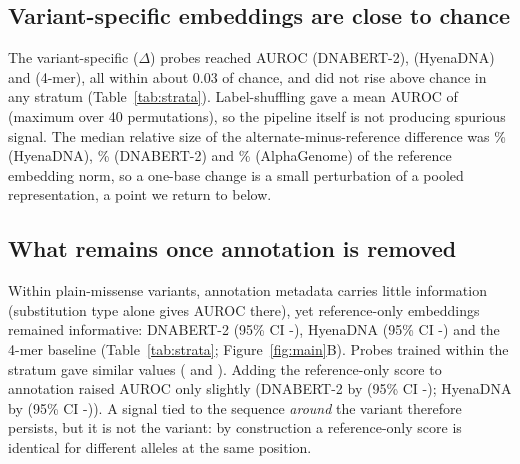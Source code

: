 \documentclass[11pt]{article}
\newcommand{\Dlt}{\Delta}
\newcommand{\ci}[2]{{\small(95\% CI #1-#2)}}
\begin{document}
\subsection{Variant-specific embeddings are close to chance}
The variant-specific ($\Dlt$) probes reached AUROC \DnbDelta{} (DNABERT-2), \HynDelta{} (HyenaDNA) and \KmDelta{} (4-mer), all within about 0.03 of chance, and did not rise above chance in any stratum (Table~\ref{tab:strata}). Label-shuffling gave a mean AUROC of \ShufMean{} (maximum \ShufMax{} over 40 permutations), so the pipeline itself is not producing spurious signal. The median relative size of the alternate-minus-reference difference was \RelHyn\% (HyenaDNA), \RelDnb\% (DNABERT-2) and \RelAg\% (AlphaGenome) of the reference embedding norm, so a one-base change is a small perturbation of a pooled representation, a point we return to below.

\subsection{What remains once annotation is removed}
Within plain-missense variants, annotation metadata carries little information (substitution type alone gives AUROC \MetaPure{} there), yet reference-only embeddings remained informative: DNABERT-2 \DnbRefPure{} \ci{\DnbRefPureLo}{\DnbRefPureHi}, HyenaDNA \HynRefPure{} \ci{\HynRefPureLo}{\HynRefPureHi} and the 4-mer baseline \KmRefPure{} (Table~\ref{tab:strata}; Figure~\ref{fig:main}B). Probes trained within the stratum gave similar values (\DnbRefPureTrained{} and \HynRefPureTrained). Adding the reference-only score to annotation raised AUROC only slightly (DNABERT-2 by \IncDnb{} \ci{\IncDnbLo}{\IncDnbHi}; HyenaDNA by \IncHyn{} \ci{\IncHynLo}{\IncHynHi}). A signal tied to the sequence \emph{around} the variant therefore persists, but it is not the variant: by construction a reference-only score is identical for different alleles at the same position.

\begin{table}[t]
\centering\small

\caption{Plain-missense stratum (\PureStratP{} pathogenic, \PureStratC{} common). With only \PureStratC{} common variants, intervals are wide and the stratum should be read as supporting, not definitive, evidence. The annotation row reflects substitution type only because consequence strings are identical within the stratum. All strata are in Supplementary Table~S4.}
\label{tab:strata}
\end{table}
\end{document}
